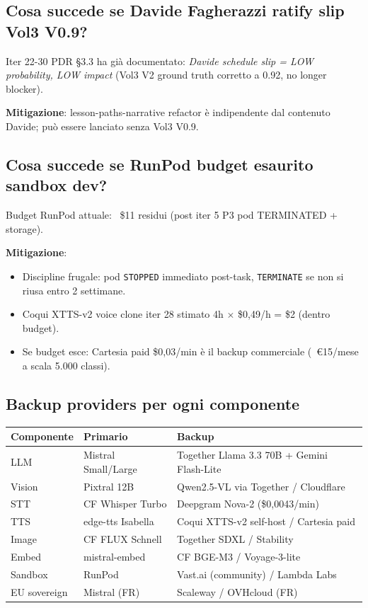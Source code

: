 \documentclass[12pt,a4paper]{article}
\begin{document}
\subsection{Cosa succede se Davide Fagherazzi ratify slip Vol3 V0.9?}

Iter 22-30 PDR §3.3 ha già documentato: \emph{Davide schedule slip = LOW probability, LOW impact} (Vol3 V2 ground truth corretto a 0.92, no longer blocker).

\textbf{Mitigazione}: lesson-paths-narrative refactor è indipendente dal contenuto Davide; può essere lanciato senza Vol3 V0.9.

\subsection{Cosa succede se RunPod budget esaurito sandbox dev?}

Budget RunPod attuale: ~\$11 residui (post iter 5 P3 pod TERMINATED + storage).

\textbf{Mitigazione}:
\begin{itemize}
  \item Discipline frugale: pod \texttt{STOPPED} immediato post-task, \texttt{TERMINATE} se non si riusa entro 2 settimane.
  \item Coqui XTTS-v2 voice clone iter 28 stimato 4h $\times$ \$0,49/h = \$2 (dentro budget).
  \item Se budget esce: Cartesia paid \$0,03/min è il backup commerciale (~€15/mese a scala 5.000 classi).
\end{itemize}

\subsection{Backup providers per ogni componente}

\begin{center}
\renewcommand{\arraystretch}{1.2}
\begin{tabular}{l l l}
\toprule
\textbf{Componente} & \textbf{Primario} & \textbf{Backup} \\
\midrule
LLM            & Mistral Small/Large    & Together Llama 3.3 70B + Gemini Flash-Lite \\
Vision         & Pixtral 12B            & Qwen2.5-VL via Together / Cloudflare \\
STT            & CF Whisper Turbo       & Deepgram Nova-2 (\$0,0043/min) \\
TTS            & edge-tts Isabella      & Coqui XTTS-v2 self-host / Cartesia paid \\
Image          & CF FLUX Schnell        & Together SDXL / Stability \\
Embed          & mistral-embed          & CF BGE-M3 / Voyage-3-lite \\
Sandbox        & RunPod                 & Vast.ai (community) / Lambda Labs \\
EU sovereign   & Mistral (FR)           & Scaleway / OVHcloud (FR) \\
\bottomrule
\end{tabular}
\end{center}
\end{document}
